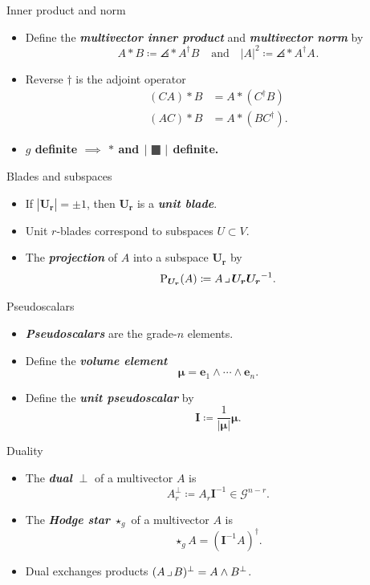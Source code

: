 \documentclass[aspectratio=169]{beamer}
\makeatletter
\newcommand\boldgreen[1]{\textcolor{lighter_csu_green}{\emph{\textbf{#1}}}}
\newcommand\boldgold[1]{\textcolor{csu_gold}{\textbf{#1}}}
\newcommand{\G}{\mathcal{G}}
\newcommand{\projection}{\operatorname{P}}
\newcommand{\blade}[1]{\boldsymbol{#1}}
\newcommand{\pseudoscalar}{\blade{I}}
\newcommand{\contract}{\hspace*{.5mm} \lrcorner \hspace*{.5mm}}
\DeclarePairedDelimiter\angles{\langle}{\rangle}
\newcommand{\proj}[2]{\angles*{#2}_{#1}}
\def\mathcolor#1#{\@mathcolor{#1}}
\def\@mathcolor#1#2#3{%
  \protect\leavevmode
  \begingroup
    \color#1{#2}#3%
  \endgroup
}
\newcommand{\blank}{\raisebox{-.3ex}{\mathcolor{light-gray}{\text{\large$\blacksquare$}}}}
\makeatother
\begin{document}
\begin{frame}{Inner product and norm}
\vfill
\begin{itemize}
\pause
\item Define the \boldgreen{multivector inner product} and \boldgreen{multivector norm} by
\[
A \ast B \coloneqq \proj{}{A^\dagger B} \quad \textrm{and} \quad |A|^2 \coloneqq \proj{}{A^\dagger A}.
\]
\pause
\item Reverse $\dagger$ is the adjoint operator
\begin{align*}
(CA) \ast B &= A \ast (C^\dagger B)\\
(AC) \ast B &= A \ast (BC^\dagger).
\end{align*}
\pause
\item \boldgold{$g$ definite $\implies$ $\ast$ and $|\blank|$ definite.}
\end{itemize}
\vfill
\end{frame}

\begin{frame}{Blades and subspaces}
\vfill
\begin{itemize}
\pause
\item If $|\blade{U_r}|=\pm 1$, then $\blade{U_r}$ is a \boldgreen{unit blade}.
\pause
\item Unit $r$-blades correspond to subspaces $U\subset V$.
\pause
\item The \boldgreen{projection} of $A$ into a subspace $\blade{U_r}$ by
\[
\projection_{\blade{U_r}} (A) \coloneqq A\contract \blade{U_r}\blade{U_r}^{-1}.
\]
\end{itemize}
\vfill
\end{frame}

\begin{frame}{Pseudoscalars}
\vfill
\begin{itemize}
\pause
\item \boldgreen{Pseudoscalars} are the grade-$n$ elements.
\pause
\item Define the \boldgreen{volume element}
\[
\blade{\mu} = \blade{e}_1 \wedge \cdots \wedge \blade{e}_n.
\]
\pause
\item Define the \boldgreen{unit pseudoscalar} by
\[
\pseudoscalar \coloneqq \frac{1}{|\blade{\mu}|} \blade{\mu}.
\]
\end{itemize}
\vfill
\end{frame}

\begin{frame}{Duality}
\vfill
\begin{itemize}
\pause
\item The \boldgreen{dual} \boldgold{$\perp$} of a multivector $A$ is
\[
A_r^\perp \coloneqq A_r \pseudoscalar^{-1} \in \G^{n-r}.
\]
\pause
\item The \boldgreen{Hodge star} \boldgold{$\star_g$} of a multivector $A$ is
\[
\star_g A = (\pseudoscalar^{-1}A)^\dagger.
\]
\pause
\item Dual exchanges products $(A \contract B)^\perp = A \wedge B^\perp$.
\end{itemize}
\vfill
\end{frame}
\end{document}
